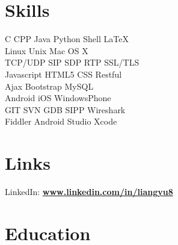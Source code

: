 \documentclass[letterpaper]{lyu-resume} %
\begin{document}
\begin{minipage}[t]{0.33\textwidth} %


\section{Skills}

C \textbullet{} CPP \textbullet{} Java \textbullet{} Python \textbullet{} Shell \textbullet{} \LaTeX\\ 
Linux \textbullet{} Unix \textbullet{} Mac OS X \\
TCP/UDP \textbullet{} SIP \textbullet{} SDP \textbullet{} RTP \textbullet{} SSL/TLS\\
Javascript \textbullet{} HTML5 \textbullet{} CSS \textbullet{} Restful \\
Ajax \textbullet{} Bootstrap \textbullet{} MySQL \\ 
Android \textbullet{} iOS \textbullet{} WindowsPhone \\
GIT \textbullet{} SVN \textbullet{} GDB \textbullet{} SIPP \textbullet{} Wireshark\\
Fiddler \textbullet{} Android Studio \textbullet{} Xcode
\sectionspace %


\section{Links} 

LinkedIn: \href{https://www.linkedin.com/in/liangyu8}{\bf www.linkedin.com/in/liangyu8} \\

\sectionspace %



\section{Education} 


\end{minipage}
\end{document}
